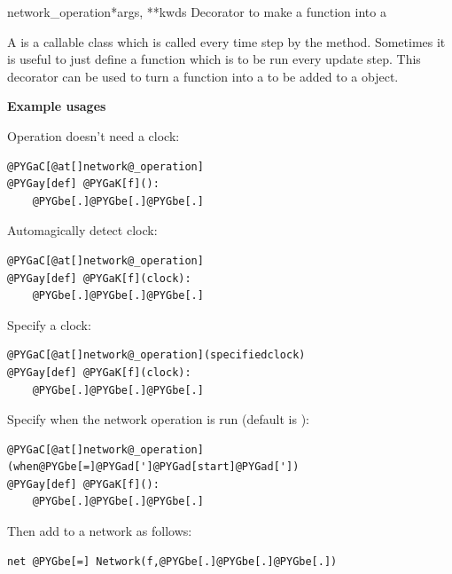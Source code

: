 \documentclass[letterpaper,10pt,english]{manual}
\begin{document}
\hypertarget{brian.network_operation}{}\begin{funcdesc}{network\_operation}{*args, **kwds}
Decorator to make a function into a \hyperlink{brian.NetworkOperation}{}

A \hyperlink{brian.NetworkOperation}{} is a callable class which is called every
time step by the \hyperlink{brian.Network}{}  method. Sometimes it is useful
to just define a function which is to be run every update step. This
decorator can be used to turn a function into a \hyperlink{brian.NetworkOperation}{}
to be added to a \hyperlink{brian.Network}{} object.

\textbf{Example usages}

Operation doesn't need a clock:

\begin{Verbatim}[commandchars=@\[\]]
@PYGaC[@at[]network@_operation]
@PYGay[def] @PYGaK[f]():
    @PYGbe[.]@PYGbe[.]@PYGbe[.]
\end{Verbatim}

Automagically detect clock:

\begin{Verbatim}[commandchars=@\[\]]
@PYGaC[@at[]network@_operation]
@PYGay[def] @PYGaK[f](clock):
    @PYGbe[.]@PYGbe[.]@PYGbe[.]
\end{Verbatim}

Specify a clock:

\begin{Verbatim}[commandchars=@\[\]]
@PYGaC[@at[]network@_operation](specifiedclock)
@PYGay[def] @PYGaK[f](clock):
    @PYGbe[.]@PYGbe[.]@PYGbe[.]
\end{Verbatim}

Specify when the network operation is run (default is ):

\begin{Verbatim}[commandchars=@\[\]]
@PYGaC[@at[]network@_operation](when@PYGbe[=]@PYGad[']@PYGad[start]@PYGad['])
@PYGay[def] @PYGaK[f]():
    @PYGbe[.]@PYGbe[.]@PYGbe[.]
\end{Verbatim}

Then add to a network as follows:

\begin{Verbatim}[commandchars=@\[\]]
net @PYGbe[=] Network(f,@PYGbe[.]@PYGbe[.]@PYGbe[.])
\end{Verbatim}
\end{funcdesc}
\end{document}
